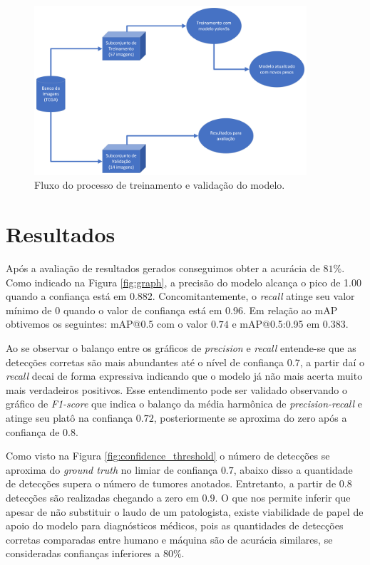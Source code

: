 \documentclass[12pt]{article}
\begin{document}
\begin{figure}[ht]
  \centering
  \includegraphics[width=0.9\textwidth]{images/methods.png}
  \caption{Fluxo do processo de treinamento e validação do modelo.}
  \label{fig:methods}
\end{figure}

\section{Resultados}

Após a avaliação de resultados gerados conseguimos obter a acurácia de $81\%$. Como indicado na Figura \ref{fig:graph}, a precisão do modelo alcança o pico de 1.00 quando a confiança está em 0.882. Concomitantemente, o {\it recall} atinge seu valor mínimo de 0 quando o valor de confiança está em 0.96. Em relação ao mAP obtivemos os seguintes: mAP@0.5 com o valor $0.74$ e mAP@0.5:0.95 em $0.383$.

Ao se observar o balanço entre os gráficos de {\it precision} e {\it recall} entende-se que as detecções corretas são mais abundantes até o nível de confiança $0.7$, a partir daí o {\it recall} decai de forma expressiva indicando que o modelo já não mais acerta muito mais verdadeiros positivos. Esse entendimento pode ser validado observando o gráfico de {\it F1-score} que indica o balanço da média harmônica de {\it precision-recall} e atinge seu platô na confiança $0.72$, posteriormente se aproxima do zero após a confiança de $0.8$.


Como visto na Figura \ref{fig:confidence_threshold} o número de detecções se aproxima do {\it ground truth} no limiar de confiança $0.7$, abaixo disso a quantidade de detecções supera o número de tumores anotados. Entretanto, a partir de $0.8$ detecções são realizadas chegando a zero em $0.9$. O que nos permite inferir que apesar de não substituir o laudo de um patologista, existe viabilidade de papel de apoio do modelo para diagnósticos médicos, pois as quantidades de detecções corretas comparadas entre humano e máquina são de acurácia similares, se consideradas confianças inferiores a $80\%$.
\end{document}
